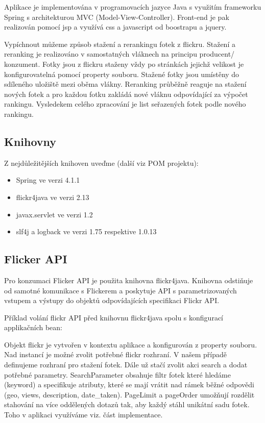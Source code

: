 \documentclass[12pt,oneside,a4paper]{article}
\begin{document}
Aplikace je implementována v programovacích jazyce Java s využitím frameworku Spring s architekturou MVC (Model-View-Controller).
Front-end je pak realizován pomocí jsp a využívá css a javascript od boostrapu a jquery.

Vypíchnout můžeme způsob stažení a rerankingu fotek z flickru. Stažení a reranking je realizováno v samostatných vláknech na principu producent/ konzument. Fotky jsou z flickru staženy vždy po stránkách jejichž velikost je konfigurovatelná pomocí property souboru. Stažené fotky jsou umístěny do sdíleného uložiště mezi oběma vlákny. Reranking průběžně reaguje na stažení nových fotek a pro každou fotku zakládá nové vláknu odpovídající za výpočet rankingu. Vysledekem celého zpracování je list seřazených fotek podle nového rankingu.

\subsection{Knihovny}
Z nejdůležitějších knihoven uveďme (další viz POM projektu):
\begin{itemize}
	\item Spring ve verzi 4.1.1
	\item flickr4java ve verzi 2.13
	\item javax.servlet ve verzi 1.2
	\item slf4j a logback ve verzi 1.75 respektive 1.0.13
\end{itemize}

\subsection{Flicker API}

Pro konzumaci Flicker API je použita knihovna flickr4java. Knihovna odstiňuje od samotné komunikace s Flickerem a poskytuje API s parametrizovaných vstupem a výstupy do objektů odpovídajících specifikaci Flickr API. 

Příklad volání flickr API před knihovnu flickr4java spolu s konfigurací applikačních bean:



Objekt flickr je vytvořen v kontextu aplikace a konfigurován z property souboru. Nad instancí je možné zvolit potřebné flickr rozhraní. V našem případě definujeme rozhraní pro stažení fotek. Dále už stačí zvolit akci search a dodat potřebné parametry. SearchParameter obsahuje filtr fotek které hledáme (keyword) a specifikuje atributy, které se mají vrátit nad rámek běžné odpovědi (geo, views, description, date\_taken). PageLimit a pageOrder umožňují rozdělit stahování na více oddělených dotazů tak, aby každý stáhl unikátní sadu fotek. Toho v aplikaci využíváme viz. část implementace.
 
\end{document}
